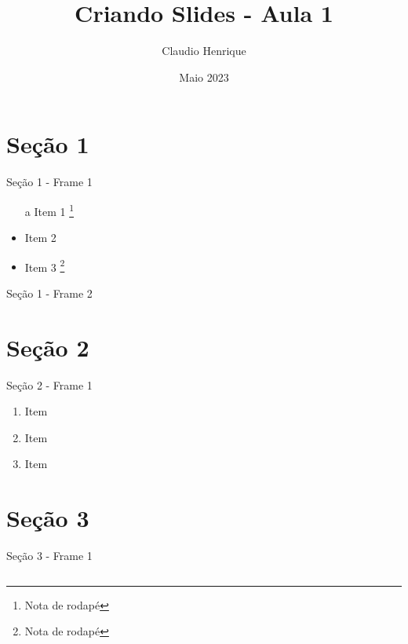 \documentclass[aspectratio=149]{beamer} %
\title{Criando Slides - Aula 1}
\author{Claudio Henrique}
\date{Maio 2023}
\begin{document}
\maketitle

\begin{frame}
	\tableofcontents %
\end{frame}

\section{Seção 1}
	\begin{frame}{Seção 1 - Frame 1}
		\begin{itemize}
			\item[a] Item 1 \footnote{Nota de rodapé}
			\item Item 2
			\item Item 3 \footnote[9]{Nota de rodapé}
		\end{itemize}
	\end{frame}
	
	\begin{frame}{Seção 1 - Frame 2}
		\lipsum[1-1]
	\end{frame}

\section{Seção 2}

	\begin{frame}{Seção 2 - Frame 1}
		\begin{enumerate} [<+- | alert@+>] %
			\item Item
			\item Item
			\item Item
		\end{enumerate}
	\end{frame}
	
\section{Seção 3}
	\begin{frame}{Seção 3 - Frame 1}
		\begin{columns}
			\lipsum[1-1]
			
			\lipsum[1-1]
		\end{columns}
	\end{frame}
\end{document}
